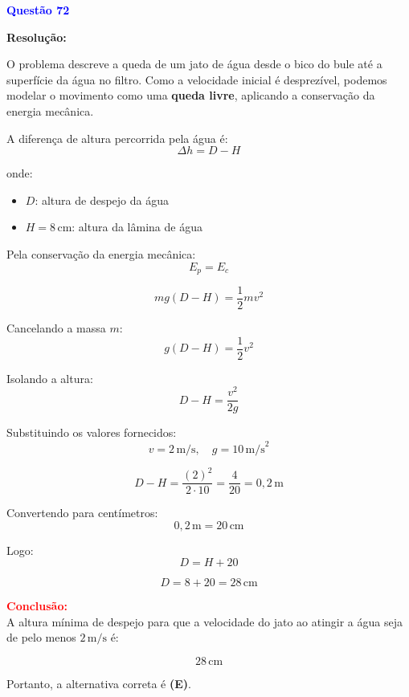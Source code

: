 \documentclass[a4paper,12pt]{article}
\newcommand{\printingbibliography}{%

    \pagestyle{myheadings}
    \markright{}
    \sloppy
    \printbibliography[heading=bibintoc, %
                   title=Refer\^encias %
                  ]
    \fussy%
}
\begin{document}
\begin{flushleft}

\textbf{\textcolor{blue}{\Large Quest\~ao 72}}\\

\vspace{0.3cm}

\textbf{Resolu\c{c}\~ao:}

\vspace{0.3cm}

O problema descreve a queda de um jato de água desde o bico do bule até a superfície da água no filtro. Como a velocidade inicial é desprezível, podemos modelar o movimento como uma \textbf{queda livre}, aplicando a conservação da energia mecânica.

\vspace{0.3cm}

A diferença de altura percorrida pela água é:
\[
\Delta h = D - H
\]

onde:
\begin{itemize}
\item \(D\): altura de despejo da água
\item \(H = 8 \, \text{cm}\): altura da lâmina de água
\end{itemize}

\vspace{0.3cm}

Pela conservação da energia mecânica:
\[
E_p = E_c
\]

\[
m g (D - H) = \frac{1}{2} m v^2
\]

Cancelando a massa \(m\):
\[
g (D - H) = \frac{1}{2} v^2
\]

\vspace{0.3cm}

Isolando a altura:
\[
D - H = \frac{v^2}{2g}
\]

Substituindo os valores fornecidos:
\[
v = 2 \, \text{m/s}, \quad g = 10 \, \text{m/s}^2
\]

\[
D - H = \frac{(2)^2}{2 \cdot 10} = \frac{4}{20} = 0{,}2 \, \text{m}
\]

Convertendo para centímetros:
\[
0{,}2 \, \text{m} = 20 \, \text{cm}
\]

\vspace{0.3cm}

Logo:
\[
D = H + 20
\]

\[
D = 8 + 20 = 28 \, \text{cm}
\]

\vspace{0.5cm}

\textcolor{red}{\textbf{Conclus\~ao:}}\\

A altura mínima de despejo para que a velocidade do jato ao atingir a água seja de pelo menos \(2 \, \text{m/s}\) é:

\[
\boxed{28 \, \text{cm}}
\]

\vspace{0.3cm}

Portanto, a alternativa correta é \textbf{(E)}.

\end{flushleft}

\end{document}

